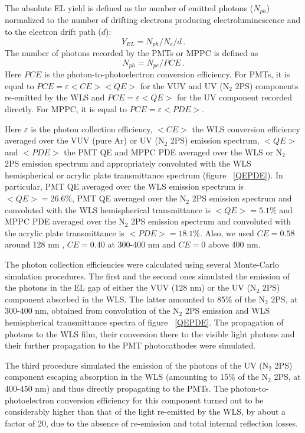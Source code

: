 \documentclass[a4paper,11pt]{article}
\begin{document}
The absolute EL yield is defined as the number of emitted photons ($N_{ph}$) normalized to the number of drifting electrons producing electroluminescence and to the electron drift path ($d$):
\begin{equation}
\label{eq.1} Y_{EL}=N_{ph}/N_e/d \,.
\end{equation}
The number of photons recorded by the PMTs or MPPC is defined as
\begin{equation}
\label{eq.1} N_{ph}=N_{pe}/PCE \,.
\end{equation}
Here $PCE$ is the photon-to-photoelectron conversion efficiency. For PMTs, it is equal to $PCE=\varepsilon <CE> <QE>$ for the VUV and UV (N$_2$ 2PS) components re-emitted by the WLS and $PCE=\varepsilon <QE>$ for the UV component recorded directly.   For MPPC, it is equal to $PCE=\varepsilon <PDE>$.

Here $\varepsilon$ is the photon collection efficiency, $<CE>$ the WLS conversion efficiency averaged over the VUV (pure Ar) or UV (N$_2$ 2PS) emission spectrum, $<QE>$ and $<PDE>$ the PMT QE and MPPC PDE averaged over the WLS or N$_2$ 2PS emission spectrum and appropriately convoluted with the WLS hemispherical or acrylic plate transmittance spectrum  (figure ~\ref{QEPDE}). In particular, PMT QE averaged over the WLS emission spectrum is $<QE>=26.6\%$, PMT QE averaged over the N$_2$ 2PS emission spectrum and convoluted with the WLS hemispherical transmittance is $<QE>=5.1\%$ and MPPC PDE averaged over the N$_2$ 2PS emission spectrum and convoluted with the acrylic plate transmittance is $<PDE>=18.1\%$. Also,  we used $CE=0.58$  around 128 nm \cite{TPB1}, $CE=0.40$ at 300-400 nm \cite{TPB1,TPB2,TPB3} and $CE=0$ above 400 nm.

The photon collection efficiencies were calculated using several Monte-Carlo simulation procedures. The first and the second ones simulated the emission of the photons in the EL gap of either the VUV (128 nm) or the UV (N$_2$ 2PS) component absorbed in the WLS. The latter amounted to 85\% of the N$_2$ 2PS, at 300-400 nm, obtained from convolution of the N$_2$ 2PS emission and WLS hemispherical transmittance spectra of figure ~\ref{QEPDE}. The propagation of photons to the WLS film, their conversion there to the visible light photons and their further propagation to the PMT photocathodes were simulated.

The third procedure simulated the emission of the photons of the UV (N$_2$ 2PS) component escaping absorption in the WLS (amounting to 15\% of the N$_2$ 2PS, at 400-450 nm) and thus directly propagating to the PMTs. The photon-to-photoelectron conversion efficiency for this component turned out to be considerably higher than that of the light re-emitted by the WLS, by about a factor of 20, due to the absence of re-emission and total internal reflection losses.
\end{document}
